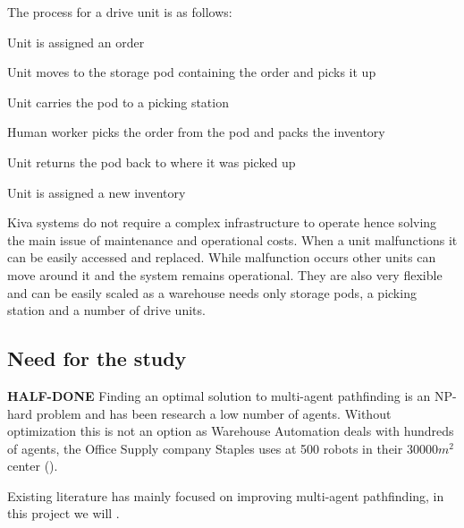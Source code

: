 \documentclass[a4paper,11pt]{article}
\begin{document}
\noindent The process for a drive unit is as follows:

\begin{compactenum}
	\item Unit is assigned an order
	\item Unit moves to the storage pod containing the order and picks it up
	\item Unit carries the pod to a picking station
	\item Human worker picks the order from the pod and packs the inventory
	\item Unit returns the pod back to where it was picked up
	\item Unit is assigned a new inventory
\end{compactenum}

\noindent Kiva systems do not require a complex infrastructure to operate hence solving the main issue of maintenance and operational costs. When a unit malfunctions it can be easily accessed and replaced. While malfunction occurs other units can move around it and the system remains operational. They are also very flexible and can be easily scaled as a warehouse needs only storage pods, a picking station and a number of drive units. 


\subsection{Need for the study}


\textbf{HALF-DONE} Finding an optimal solution to multi-agent pathfinding is an NP-hard problem and has been research a low number of agents. Without optimization this is not an option as Warehouse Automation deals with hundreds of agents, the Office Supply company Staples uses at 500 robots in their 30000$m^{2}$ center (\cite{guizzo2008three}).

Existing literature has mainly focused on improving multi-agent pathfinding, in this project we will .

\end{document}
